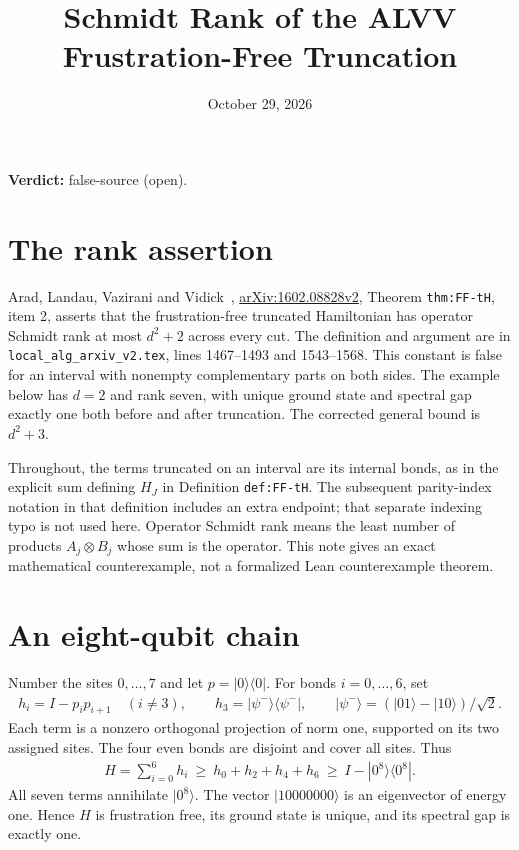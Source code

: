 \documentclass{article}
\title{Schmidt Rank of the ALVV Frustration-Free Truncation}
\author{}
\date{October 29, 2026}
\providecommand{\gapnote}[2]{\par\noindent\textbf{Verdict:} #1 (#2).\par}
\begin{document}
\maketitle
\gapnote{false-source}{open}

\section{The rank assertion}

Arad, Landau, Vazirani and Vidick~\cite{Arad2016RigorousRG},
\href{https://arxiv.org/abs/1602.08828v2}{arXiv:1602.08828v2},
Theorem \texttt{thm:FF-tH}, item 2, asserts that the frustration-free
truncated Hamiltonian has operator Schmidt rank at most $d^2+2$ across
every cut. The definition and argument are in
\texttt{local\_alg\_arxiv\_v2.tex}, lines 1467--1493 and 1543--1568.
This constant is false for an interval with nonempty complementary
parts on both sides. The example below has $d=2$ and rank seven,
with unique ground state and spectral gap exactly one both before
and after truncation. The corrected general bound is $d^2+3$.

Throughout, the terms truncated on an interval are its internal bonds,
as in the explicit sum defining $H_J$ in Definition \texttt{def:FF-tH}.
The subsequent parity-index notation in that definition includes an
extra endpoint; that separate indexing typo is not used here.
Operator Schmidt rank means the least number of products $A_j\otimes B_j$
whose sum is the operator. This note gives an exact mathematical
counterexample, not a formalized Lean counterexample theorem.

\section{An eight-qubit chain}

Number the sites $0,\ldots,7$ and let $p=|0\rangle\langle0|$.
For bonds $i=0,\ldots,6$, set
\begin{align}
 h_i=I-p_i p_{i+1}\quad(i\ne3),\qquad
 h_3=|\psi^-\rangle\langle\psi^-|,\qquad
 |\psi^-\rangle=(|01\rangle-|10\rangle)/\sqrt2.
    \label{eq:ff_rank_bond_terms}
\end{align}
Each term is a nonzero orthogonal projection of norm one, supported on
its two assigned sites. The four even bonds are disjoint and cover
all sites. Thus
\begin{align}
 H=\sum_{i=0}^6h_i\ \ge\ h_0+h_2+h_4+h_6
       \ \ge\ I-|0^8\rangle\langle0^8|.
    \label{eq:ff_rank_hamiltonian_lower_bound}
\end{align}
All seven terms annihilate $|0^8\rangle$. The vector $|10000000\rangle$
is an eigenvector of energy one. Hence $H$ is frustration free, its
ground state is unique, and its spectral gap is exactly one.
\end{document}
